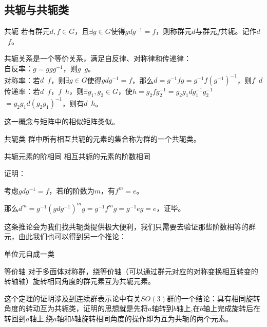 

\subsection{共轭与共轭类}

\begin{definition}{共轭}\label{def_gpcon_2}
若有群元$d,f\in G$，且$\exists g\in G$使得$gdg^{-1}=f$，则称群元$d$与群元$f$共轭。记作$d$~$f$。
\end{definition}

共轭关系是一个等价关系，满足自反律、对称律和传递律：\\
自反率：$g=ggg^{-1}$，则$g$~$g$。 \\
对称率：若$d$~$f$，则$\exists g\in G$使得$gdg^{-1}=f$，那么$d=g^{-1}fg=
g^{-1}f(g^{-1})^{-1}$，则$f$~$d$ \\
传递率：若$d$~$f$，$f$~$h$，则$\exists g_1,g_2\in G$，使$h=g_2fg_2^{-1}=
g_2g_1dg_1^{-1}g_2^{-1}$ $=g_2g_1d(g_2g_1)^{-1}$，则有$d$~$h$。

这一概念与矩阵中的相似矩阵类似。

\begin{definition}{共轭类}\label{def_gpcon_1}
群中所有相互共轭的元素的集合称为群的一个共轭类。
\end{definition}

\begin{corollary}{共轭元素的阶相同}
相互共轭的元素的阶数相同
\end{corollary}
证明： 

考虑$gdg^{-1}=f$，若f的阶数为$m$，有$f^m=e$。

那么$d^m=g^{-1}(gdg^{-1})^mg=g^{-1}f^mg=g^{-1}eg=e$，证毕。

这条推论会为我们找共轭类提供极大便利，我们只需要去验证那些阶数相等的群元，由此我们也可以得到另一个推论：
\begin{corollary}{}
单位元自成一类
\end{corollary}
\begin{corollary}{等价轴}
对于多面体对称群，绕等价轴（可以通过群元对应的对称变换相互转变的转轴轴）旋转相同角度的群元素互为共轭元素。
\end{corollary}

这个定理的证明涉及到连续群表示论中有关$SO(3)$群的一个结论：具有相同旋转角度的转动互为共轭类，证明的思想就是先将$a$轴转到$b$轴上,在$b$轴上完成旋转后在转回到$a$轴上,绕$a$轴和$b$轴旋转相同角度的操作即为互为共轭的两个元素。

